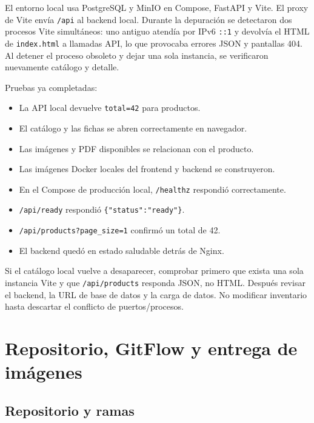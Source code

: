 \documentclass[11pt,a4paper]{article}
\newcommand{\code}[1]{\nolinkurl{#1}}
\begin{document}
El entorno local usa PostgreSQL y MinIO en Compose, FastAPI y Vite. El proxy de Vite envía \code{/api} al backend local. Durante la depuración se detectaron dos procesos Vite simultáneos: uno antiguo atendía por IPv6 \code{::1} y devolvía el HTML de \code{index.html} a llamadas API, lo que provocaba errores JSON y pantallas 404. Al detener el proceso obsoleto y dejar una sola instancia, se verificaron nuevamente catálogo y detalle.

Pruebas ya completadas:
\begin{itemize}
  \item La API local devuelve \code{total=42} para productos.
  \item El catálogo y las fichas se abren correctamente en navegador.
  \item Las imágenes y PDF disponibles se relacionan con el producto.
  \item Las imágenes Docker locales del frontend y backend se construyeron.
  \item En el Compose de producción local, \code{/healthz} respondió correctamente.
  \item \code{/api/ready} respondió \code{\{"status":"ready"\}}.
  \item \code{/api/products?page_size=1} confirmó un total de 42.
  \item El backend quedó en estado saludable detrás de Nginx.
\end{itemize}

\begin{warningbox}
Si el catálogo local vuelve a desaparecer, comprobar primero que exista una sola instancia Vite y que \code{/api/products} responda JSON, no HTML. Después revisar el backend, la URL de base de datos y la carga de datos. No modificar inventario hasta descartar el conflicto de puertos/procesos.
\end{warningbox}

\section{Repositorio, GitFlow y entrega de imágenes}

\subsection{Repositorio y ramas}
\end{document}
